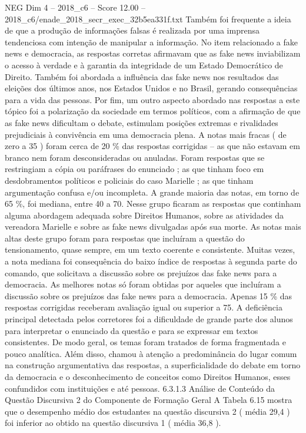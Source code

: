 \begin{textsample}{NEG Dim 4 – 2018\_c6 – Score 12.00 – 2018\_c6/enade\_2018\_secr\_exec\_32b5ea331f.txt}
Também foi frequente a ideia de que a produção de informações falsas é realizada por uma imprensa tendenciosa com intenção de manipular a informação.
No item relacionado a fake news e democracia, as respostas corretas afirmavam que as fake news inviabilizam o acesso à verdade e à garantia da integridade de um Estado Democrático de Direito.
Também foi abordada a influência das fake news nos resultados das eleições dos últimos anos, nos Estados Unidos e no Brasil, gerando consequências para a vida das pessoas.
Por fim, um outro aspecto abordado nas respostas a este tópico foi a polarização da sociedade em termos políticos, com a afirmação de que as fake news dificultam o debate, estimulam posições extremas e rivalidades prejudiciais à convivência em uma democracia plena.
A notas mais fracas ( de zero a 35 ) foram cerca de 20 \% das respostas corrigidas – as que não estavam em branco nem foram desconsideradas ou anuladas.
Foram respostas que se restringiam a cópia ou paráfrases do enunciado ; as que tinham foco em desdobramentos políticos e policiais do caso Marielle ; as que tinham argumentação confusa e/ou incompleta.
A grande maioria das notas, em torno de 65 \%, foi mediana, entre 40 a 70.
Nesse grupo ficaram as respostas que continham alguma abordagem adequada sobre Direitos Humanos, sobre as atividades da vereadora Marielle e sobre as fake news divulgadas após sua morte.
As notas mais altas deste grupo foram para respostas que incluíram a questão do tensionamento, quase sempre, em um texto coerente e consistente.
Muitas vezes, a nota mediana foi consequência do baixo índice de respostas à segunda parte do comando, que solicitava a discussão sobre os prejuízos das fake news para a democracia.
As melhores notas só foram obtidas por aqueles que incluíram a discussão sobre os prejuízos das fake news para a democracia.
Apenas 15 \% das respostas corrigidas receberam avaliação igual ou superior a 75.
A deficiência principal detectada pelos corretores foi a dificuldade de grande parte dos alunos para interpretar o enunciado da questão e para se expressar em textos consistentes.
De modo geral, os temas foram tratados de forma fragmentada e pouco analítica.
Além disso, chamou à atenção a predominância do lugar comum na construção argumentativa das respostas, a superficialidade do debate em torno da democracia e o desconhecimento de conceitos como Direitos Humanos, esses confundidos com instituições e até pessoas. 6.3.1.3 Análise de Conteúdo da Questão Discursiva 2 do Componente de Formação Geral A Tabela 6.15 mostra que o desempenho médio dos estudantes na questão discursiva 2 ( média 29,4 ) foi inferior ao obtido na questão discursiva 1 ( média 36,8 ).

\end{textsample}
